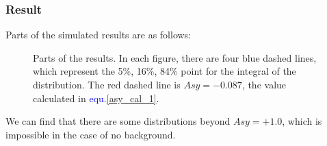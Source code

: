 \documentclass[a4paper,12pt]{article}
\begin{document}
\subsubsection{Result}
Parts of the simulated results are as follows:
\begin{figure}[H]
\centering
{}
\quad
{}
\quad
{}
\quad
{}
\quad
{}
\quad
{}
\caption{Parts of the results. In each figure, there are four blue dashed lines, which represent the 5\%, 16\%, 84\% point for the integral of the distribution. The red dashed line is $Asy=-0.087$, the value calculated in \textcolor{blue}{equ.\ref{asy_cal_1}}.}
\label{multi_figures_bkg}
\end{figure}
We can find that there are some distributions beyond $Asy=+1.0$, which is impossible in the case of no background.
\end{document}
